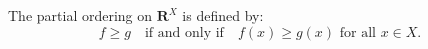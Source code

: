 The partial ordering on $\mathbf{R}^X$ is defined by:
$$f \geq g \quad \text{if and only if} \quad f(x) \geq g(x) \text{ for all } x \in X.$$
